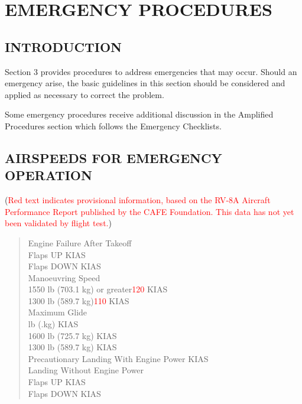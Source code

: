 \chapter{EMERGENCY PROCEDURES}
\vspace{\minitocspacebefore}
\minitoc
\cleardoublepage
\section{INTRODUCTION}
Section 3 provides procedures to address emergencies that may occur.   Should an emergency arise, the basic guidelines in this section should be considered and applied as necessary to correct the problem.

Some emergency procedures receive additional discussion in the Amplified Procedures section which follows the Emergency Checklists.

\section{AIRSPEEDS FOR EMERGENCY OPERATION}
(\textcolor{red}{Red text indicates provisional information, based
on the RV-8A Aircraft Performance Report published by the CAFE Foundation. This data has not yet been validated by flight test.})

\begin{quote}
Engine Failure After Takeoff\\
\newlength\emertab
\setlength\emertab{0.2in}
\hspace*{\emertab}Flaps UP KIAS\\
\hspace*{\emertab}Flaps DOWN KIAS\\
Manoeuvring Speed\\
\hspace*{\emertab}1550 lb (703.1 kg) or greater\dotfill \textcolor{red}{120} KIAS\\
\hspace*{\emertab}1300 lb (589.7 kg)\dotfill \textcolor{red}{110} KIAS\\
Maximum Glide\\
\hspace*{\emertab}\theMTOW \space lb (\theMTOWkg .\theMTOWkgdecimal \space kg) KIAS\\
\hspace*{\emertab}1600 lb (725.7 kg) KIAS\\
\hspace*{\emertab}1300 lb (589.7 kg) KIAS\\
Precautionary Landing With Engine Power KIAS\\
Landing Without Engine Power\\
\hspace*{\emertab}Flaps UP KIAS\\
\hspace*{\emertab}Flaps DOWN KIAS
\end{quote}

